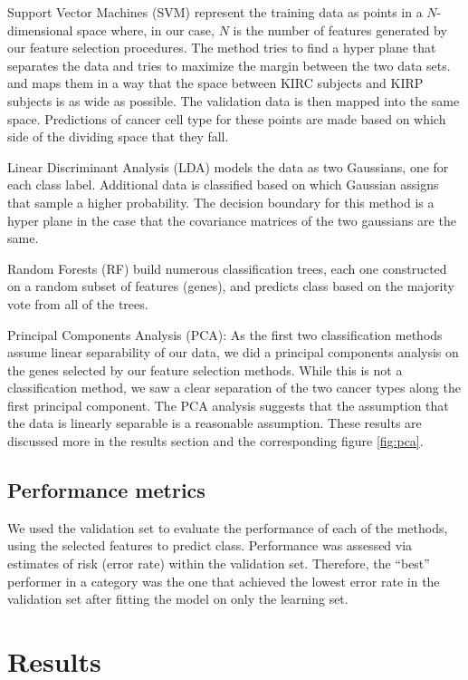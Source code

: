 Support Vector Machines (SVM) represent the training data as points in a
$N$-dimensional space where, in our case, $N$ is the number of features
generated by our feature selection procedures. The method tries to find a hyper
plane that separates the data and tries to maximize the margin between the two
data sets. and maps them in a way that the space between KIRC subjects and KIRP
subjects is as wide as possible. The validation data is then mapped into the
same space.  Predictions of cancer cell type for these points are made based on
which side of the dividing space that they fall. 

Linear Discriminant Analysis (LDA) models the data as two Gaussians, one for
each class label. Additional data is classified based on which Gaussian assigns
that sample a higher probability. The decision boundary for this method is a
hyper plane in the case that the covariance matrices of the two gaussians are
the same. 

Random Forests (RF) build numerous classification trees, each one constructed
on a random subset of features (genes), and predicts class based on the
majority vote from all of the trees.

Principal Components Analysis (PCA): As the first two classification methods
assume linear separability of our data, we did a principal components analysis
on the genes selected by our feature selection methods.  While this is not a
classification method, we saw a clear separation of the two cancer types along
the first principal component. The PCA analysis suggests that the assumption
that the data is linearly separable is a reasonable assumption. These results
are discussed more in the results section and the corresponding figure
\ref{fig:pca}. 

\subsection*{Performance metrics}

We used the validation set to evaluate the performance of each of the methods,
using the selected features to predict class. Performance was assessed via
estimates of risk (error rate) within the validation set. Therefore, the
``best'' performer in a category was the one that achieved the lowest error
rate in the validation set after fitting the model on only the learning set.

\section{Results}

